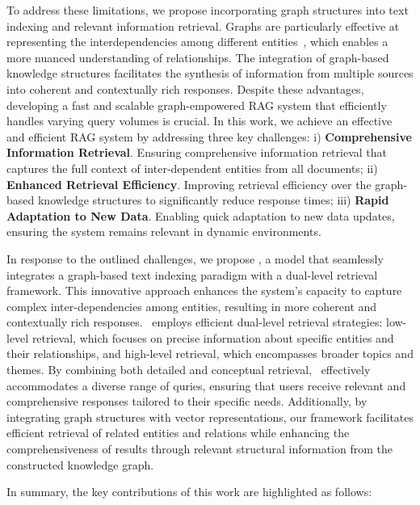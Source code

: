 To address these limitations, we propose incorporating graph structures into text indexing and relevant information retrieval. Graphs are particularly effective at representing the interdependencies among different entities~\cite{rampavsek2022recipe}, which enables a more nuanced understanding of relationships. The integration of graph-based knowledge structures facilitates the synthesis of information from multiple sources into coherent and contextually rich responses. Despite these advantages, developing a fast and scalable graph-empowered RAG system that efficiently handles varying query volumes is crucial. In this work, we achieve an effective and efficient RAG system by addressing three key challenges: i) \textbf{Comprehensive Information Retrieval}. Ensuring comprehensive information retrieval that captures the full context of inter-dependent entities from all documents; ii) \textbf{Enhanced Retrieval Efficiency}. Improving retrieval efficiency over the graph-based knowledge structures to significantly reduce response times; iii) \textbf{Rapid Adaptation to New Data}. Enabling quick adaptation to new data updates, ensuring the system remains relevant in dynamic environments.

In response to the outlined challenges, we propose \model, a model that seamlessly integrates a graph-based text indexing paradigm with a dual-level retrieval framework. This innovative approach enhances the system's capacity to capture complex inter-dependencies among entities, resulting in more coherent and contextually rich responses. \model\ employs efficient dual-level retrieval strategies: low-level retrieval, which focuses on precise information about specific entities and their relationships, and high-level retrieval, which encompasses broader topics and themes. By combining both detailed and conceptual retrieval, \model\ effectively accommodates a diverse range of quries, ensuring that users receive relevant and comprehensive responses tailored to their specific needs. Additionally, by integrating graph structures with vector representations, our framework facilitates efficient retrieval of related entities and relations while enhancing the comprehensiveness of results through relevant structural information from the constructed knowledge graph.

In summary, the key contributions of this work are highlighted as follows:

